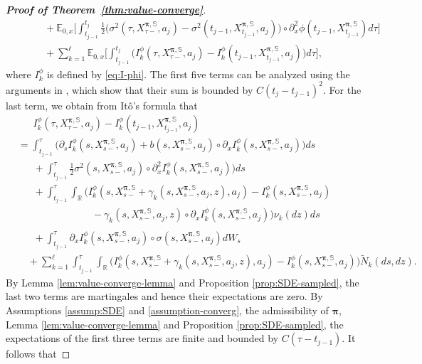 \documentclass[11pt]{article}
\newcommand{\1}{\mathbbm{1}}
\newcommand{\bpi}{\boldsymbol{\pi}}
\begin{document}
\begin{proof}[\bf Proof of Theorem~\ref{thm:value-converge}]
\begin{align}
&\phantom{==}+\mathbb{E}_{0,x}\Big[\int_{t_{j-1}}^{t_j}\frac{1}{2}\big(\sigma^2(\tau, X_{\tau-}^{\bpi, \mathbb{S}}, a_{j})-\sigma^2(t_{j-1}, X_{t_{j-1}}^{\bpi, \mathbb{S}}, a_{j})\big)\circ \partial_x^2\phi(t_{j-1}, X_{t_{j-1}}^{\bpi, \mathbb{S}})d\tau\Big]\\
&\phantom{==}+\sum_{k=1}^\ell\mathbb{E}_{0,x}\Big[\int_{t_{j-1}}^{t_j}\big(I_k^\phi(\tau, X_{\tau-}^{\bpi, \mathbb{S}},a_{j})-I_k^\phi(t_{j-1}, X_{t_{j-1}}^{\bpi, \mathbb{S}},a_{j})\big)d\tau\Big],
\end{align}
where $I_k^{\phi}$ is defined by \eqref{eq:I-phi}. The first five terms can be analyzed using the arguments in \cite{jia2025accuracy}, which show that their sum is bounded by $C(t_j-t_{j-1})^2$. For the last term, we obtain from It\^o's formula that
\begin{align}
	&\phantom{=~}I_k^\phi(\tau, X_{\tau-}^{\bpi, \mathbb{S}},a_{j})-I_k^\phi(t_{j-1}, X_{t_{j-1}}^{\bpi, \mathbb{S}},a_{j})\\
	&=\int_{t_{j-1}}^{\tau}\big(\partial_sI_k^\phi(s, X_{s-}^{\bpi, \mathbb{S}},a_{j}) + b(s, X_{s-}^{\bpi, \mathbb{S}},a_{j})\circ\partial_xI_k^\phi(s, X_{s-}^{\bpi, \mathbb{S}},a_{j}) \big)ds \\
	&\phantom{=~} + \int_{t_{j-1}}^{\tau}\frac{1}{2}\sigma^2(s, X_{s-}^{\bpi, \mathbb{S}},a_{j})\circ\partial_{x}^2I_k^\phi(s, X_{s-}^{\bpi, \mathbb{S}},a_{j}) \big)ds\\
	&\phantom{=~} + \int_{t_{j-1}}^{\tau}\int_\mathbb{R}\big(I_k^\phi(s,X_{s-}^{\bpi, \mathbb{S}}+\gamma_k(s,X_{s-}^{\bpi, \mathbb{S}},a_j,z),a_j)-I_k^\phi(s,X_{s-}^{\bpi, \mathbb{S}},a_j)\\
	&\phantom{=~\int_{t_{j-1}}^{\tau}\int_\mathbb{R}()~} -\gamma_k(s,X_{s-}^{\bpi, \mathbb{S}},a_j,z)\circ\partial_xI_k^\phi(s,X_{s-}^{\bpi, \mathbb{S}},a_j)\big)\nu_k(dz)ds\\
	&\phantom{=~} +  \int_{t_{j-1}}^{\tau}\partial_xI_k^\phi(s, X_{s-}^{\bpi, \mathbb{S}},a_{j}) \circ {\sigma}(s,  X^{\bpi, \mathbb{S}}_{s-}, a_j) dW_s \\
	& \quad +  \sum_{k=1}^\ell \int_{t_{j-1}}^{\tau} \int_{\mathbb{R}}\big(I_k^\phi(s, X^{\bpi, \mathbb{S}}_{s-} + \gamma_k(s, X^{\bpi, \mathbb{S}}_{s-}, a_j, z), a_j)-  I_k^\phi(s, X^{\bpi, \mathbb{S}}_{s-}, a_j)\big) \widetilde{N}_k(ds, dz).
\end{align}
By Lemma \ref{lem:value-converge-lemma} and Proposition \ref{prop:SDE-sampled}, the last two terms are martingales and hence their expectations are zero. By Assumptions \ref{assump:SDE} and \ref{assumption-converg}, the admissibility of $\bpi$, Lemma \ref{lem:value-converge-lemma} and Proposition \ref{prop:SDE-sampled}, the expectations of the first three terms are finite and bounded by $C(\tau-t_{j-1})$. It follows that

\end{proof}
\end{document}
